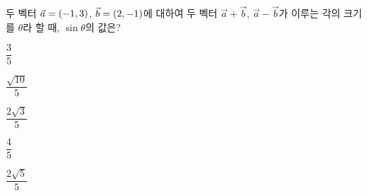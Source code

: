 두 벡터 $\vec{a}=(-1{,}\mkern3mu\mathopen{}3)$, $\vec{b}=(2{,}\mkern3mu\mathopen{}-1)$에 대하여 두 벡터 $\vec{a}+\vec{b}$, $\vec{a}-\vec{b}$가 이루는 각의 크기를 $\theta$라 할 때, $\sin\theta$의 값은?
\begin{choices32}{\rule[-3ex]{0pt}{8ex}$\dfrac{3}{5}$}{\rule[-3ex]{0pt}{8ex}$\dfrac{\sqrt{10}}{5}$}{\rule[-3ex]{0pt}{8ex}$\dfrac{2\sqrt{3}}{5}$}{\rule[-3ex]{0pt}{8ex}$\dfrac{4}{5}$}{\rule[-3ex]{0pt}{8ex}$\dfrac{2\sqrt{5}}{5}$}\end{choices32}
